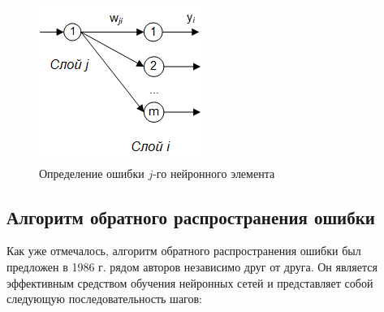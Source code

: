 \begin{figure}[H]
    \centering
    \includegraphics{images/chapter1/Определение ошибки j-го нейронного элемента.png}
    \caption{Определение ошибки $j$-го нейронного элемента}
    \label{fig:neuron_error}
\end{figure}

\subsection{Алгоритм обратного распространения ошибки}

Как уже отмечалось, алгоритм обратного распространения ошибки был предложен в 1986 г. рядом авторов независимо друг от друга. Он является эффективным средством обучения нейронных сетей и представляет собой следующую последовательность шагов:

